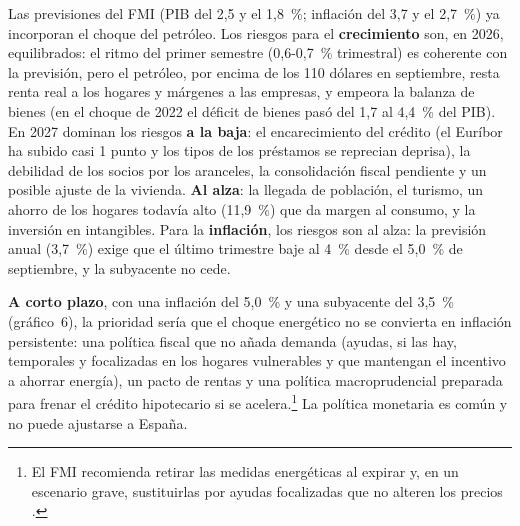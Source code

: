 \begin{examen}
Las previsiones del FMI (PIB del 2,5 y el 1,8~\%; inflación del 3,7 y el 2,7~\%) ya incorporan el choque del petróleo. Los riesgos para el \textbf{crecimiento} son, en 2026, equilibrados: el ritmo del primer semestre (0,6-0,7~\% trimestral) es coherente con la previsión, pero el petróleo, por encima de los 110 dólares en septiembre, resta renta real a los hogares y márgenes a las empresas, y empeora la balanza de bienes (en el choque de 2022 el déficit de bienes pasó del 1,7 al 4,4~\% del PIB). En 2027 dominan los riesgos \textbf{a la baja}: el encarecimiento del crédito (el Euríbor ha subido casi 1 punto y los tipos de los préstamos se reprecian deprisa), la debilidad de los socios por los aranceles, la consolidación fiscal pendiente y un posible ajuste de la vivienda. \textbf{Al alza}: la llegada de población, el turismo, un ahorro de los hogares todavía alto (11,9~\%) que da margen al consumo, y la inversión en intangibles. Para la \textbf{inflación}, los riesgos son al alza: la previsión anual (3,7~\%) exige que el último trimestre baje al 4~\% desde el 5,0~\% de septiembre, y la subyacente no cede.

\textbf{A corto plazo}, con una inflación del 5,0~\% y una subyacente del 3,5~\% (gráfico~6), la prioridad sería que el choque energético no se convierta en inflación persistente: una política fiscal que no añada demanda (ayudas, si las hay, temporales y focalizadas en los hogares vulnerables y que mantengan el incentivo a ahorrar energía), un pacto de rentas y una política macroprudencial preparada para frenar el crédito hipotecario si se acelera.\footnote{El FMI recomienda retirar las medidas energéticas al expirar y, en un escenario grave, sustituirlas por ayudas focalizadas que no alteren los precios .} La política monetaria es común y no puede ajustarse a España.


\end{examen}
